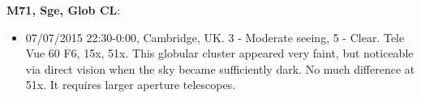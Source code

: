 {\bf M71, Sge, Glob CL}:
\begin{itemize}
\item 07/07/2015 22:30-0:00, Cambridge, UK. 3 - Moderate seeing, 5 - Clear. Tele Vue 60 F6, 15x, 51x. This globular cluster appeared very faint, but noticeable via direct vision when the sky became sufficiently dark. No much difference at 51x. It requires larger aperture telescopes.
\end{itemize}
